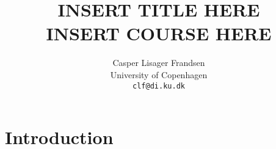 \documentclass{article}
\title{
  INSERT TITLE HERE\\
  INSERT COURSE HERE
}
\author{Casper Lisager Frandsen\\
  University of Copenhagen\\
  \texttt{clf@di.ku.dk}
}
\begin{document}
\maketitle




\section{Introduction}





\end{document}
